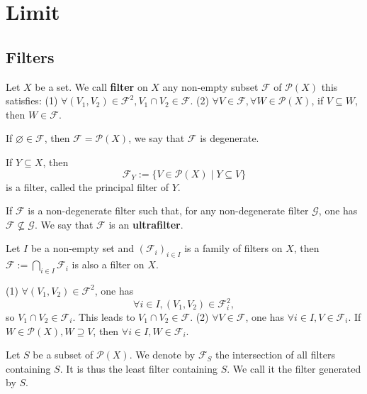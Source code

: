 \chapter{Limit}
\section{Filters}
\begin{definitionenv}
    Let $X$ be a set. We call \textbf{filter} on $X$ any non-empty subset $\mathcal{F}$ of $\mathscr{P}(X)$ this satisfies:
    \newline
    (1) $\forall(V_1,V_2)\in \mathcal{F}^2, V_1\cap V_2\in \mathcal{F}$.
    \newline
    (2) $ \forall V\in \mathcal{F}, \forall W\in \mathscr{P}(X)$, if $V\subseteq W$, then $W\in \mathcal{F}$.
\end{definitionenv}
\begin{remark}
    \quad\newline
    If $\varnothing\in \mathcal{F}$, then $\mathcal{F}=\mathscr{P}(X)$, we say that $\mathcal{F}$ is degenerate.

\begin{exampleenv}
    If $Y\subseteq X$, then 
    $$\mathcal{F}_Y:=\{V\in \mathscr{P}(X)\mid Y\subseteq V\}$$
    is a filter, called the principal filter of $Y$.
\end{exampleenv}
If $\mathcal{F}$ is a non-degenerate filter such that, for any non-degenerate filter $\mathcal{G}$, one has $\mathcal{F}\nsubseteq \mathcal{G}$. We say that $\mathcal{F}$ is an \textbf{ultrafilter}.
\end{remark}
\begin{propositionenv}
    Let $I$ be a non-empty set and $(\mathcal{F}_i)_{i\in I}$ is a family of filters on $X$, then $\displaystyle \mathcal{F}:=\bigcap_{i\in I}\mathcal{F}_i$ is also a filter on $X$.
\end{propositionenv}
\begin{proofenv}
    \quad
    \newline
    (1) $\forall (V_1,V_2)\in \mathcal{F}^2$, one has 
    $$\forall i\in I, (V_1,V_2)\in \mathcal{F}_i^2,$$
    so $V_1\cap V_2\in \mathcal{F}_i$. This leads to $V_1\cap V_2\in \mathcal{F}$.
    \newline
    (2) $\forall V\in \mathcal{F}$, one has $\forall i\in I, V\in \mathcal{F}_i$. If $W\in \mathscr{P}(X), W\supseteq V $, then $\forall i\in I, W\in \mathcal{F}_i$.
\end{proofenv}
\begin{definitionenv}
    Let $S$ be a subset of $\mathscr{P}(X)$. We denote by $\mathcal{F}_S$ the intersection of all filters containing $S$. It is thus the least filter containing $S$. We call it the filter generated by $S$.
\end{definitionenv}
